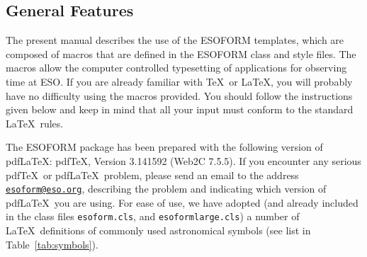 \documentclass{article}
\begin{document}
\subsection{General Features}

The present manual describes the use of the ESOFORM templates,
which are composed of macros that are defined in the ESOFORM class and
style files. The macros allow the 
computer controlled typesetting of applications for observing time at
ESO.  If you are already familiar with \TeX\ or \LaTeX, you will
probably have no difficulty using the macros provided.  You should
follow the instructions given below and keep in mind that all your
input must conform to the standard \LaTeX\ rules.

The ESOFORM package has been prepared with the following
version of pdf\LaTeX: pdf\TeX, Version 3.141592 (Web2C 7.5.5).  If you
encounter any serious pdf\TeX\ or pdf\LaTeX\ problem, please send an
email to the address \href{mailto:esoformeso.org}{\tt esoform@eso.org},
describing the problem and indicating which version of pdf\LaTeX\ you
are using.  For ease of use, we have adopted (and already included in
the class files {\tt esoform.cls},  and {\tt esoformlarge.cls}) 
a number of \LaTeX\ definitions of commonly used
astronomical symbols (see list in Table~\ref{tab:symbols}).
\end{document}
